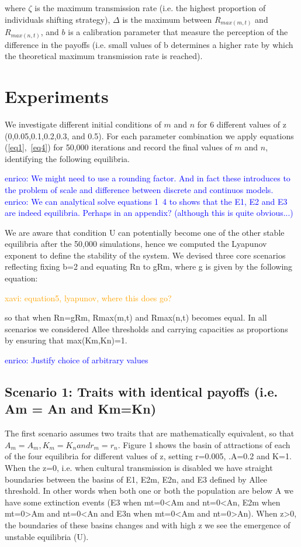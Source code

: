 \documentclass[preprint,authoryear]{elsarticle}
\newcommand{\memo}[2]{\textcolor{#1}{#2}}
\newcommand{\xavi}[1]{\memo{orange}{xavi: #1\\}}
\newcommand{\enrico}[1]{\memo{blue}{enrico: #1\\}}
\begin{document}
where $\zeta$ is the maximum transmission rate (i.e. the highest proportion of individuals shifting strategy), $\Delta$ is the maximum between $R_{max(m,t)}$ and $R_{max(n,t)}$, and $b$ is a calibration parameter that measure the perception of the difference in the payoffs (i.e. small values of b determines a higher rate by which the theoretical maximum transmission rate is reached).

\section{Experiments}

We investigate different initial conditions of $m$ and $n$ for 6 different values of z (0,0.05,0.1,0.2,0.3, and 0.5). For each parameter combination we apply equations (\ref{eq1},~\ref{eq4}) for 50,000 iterations and record the final values of $m$ and $n$, identifying the following equilibria.

\enrico{We might need to use a rounding factor. And in fact these introduces to the problem of scale and difference between discrete and continuos  models.}
\enrico{We can analytical solve equations 1~4 to shows that the E1, E2 and E3 are indeed equilibria. Perhaps in an appendix? (although this is quite obvious...)}

We are aware that condition U can potentially become one of the other stable equilibria after the 50,000 simulations, hence we computed the Lyapunov exponent to define the stability of the system. We devised three core scenarios reflecting fixing b=2 and equating Rn to gRm, where g is given by the following equation:

\xavi{equation5, lyapunov, where this does go?}

so that when Rn=gRm,  Rmax(m,t) and Rmax(n,t) becomes equal. In all scenarios we considered Allee thresholds and carrying capacities as proportions by ensuring that max(Km,Kn)=1.

\enrico{Justify choice of arbitrary values}

\subsection{Scenario 1: Traits with identical payoffs (i.e. Am = An   and Km=Kn)}

The first scenario assumes two traits that are mathematically equivalent, so that $A_m = A_m, K_m=K_n and r_m=r_n$. Figure 1 shows the basin of attractions of each of the four equilibria for different values of z, setting r=0.005, .A=0.2 and K=1. When the z=0, i.e. when cultural transmission is disabled we have straight boundaries between the basins of E1, E2m, E2n, and E3 defined by Allee threshold. In other words when both one or both the population are below A we have some extinction events (E3 when mt=0<Am and nt=0<An, E2m when mt=0>Am and nt=0<An and E3n when mt=0<Am and nt=0>An). When z>0, the boundaries of these basins changes and with high z we see the emergence of unstable equilibria (U). 
\end{document}
